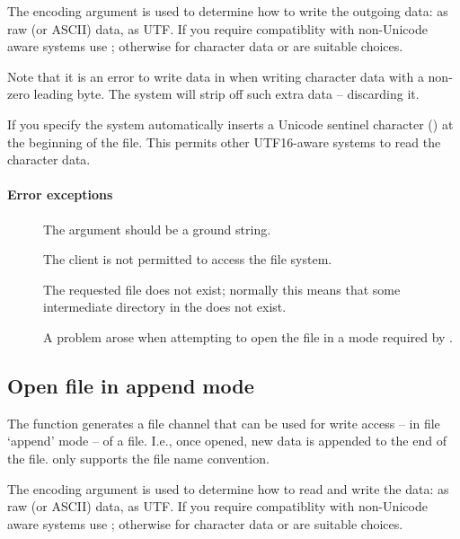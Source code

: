 The encoding argument is used to determine how to write the outgoing data: as raw (or ASCII) data, as UTF. If you require compatiblity with non-Unicode aware systems use ; otherwise for character data  or  are suitable choices.

Note that it is an error to write data in  when writing character data with a non-zero leading byte. The \go system will strip off such extra data -- discarding it.

If you specify  the \go system automatically inserts a Unicode sentinel character () at the beginning of the file. This permits other UTF16-aware systems to read the character data.

\paragraph{Error exceptions}
\begin{description}
\item[]
The  argument should be a ground string.
\item[]
The client is not permitted to access the file system.
\item[]
The requested file does not exist; normally this means that some intermediate directory in the  does not exist.
\item[]
A problem arose when attempting to open the file in a mode required by \go.
\end{description}

\subsection{Open file in append mode}
\label{io:openappend}
The  function generates a file channel that can be used for write access -- in file `append' mode -- of a file. I.e., once opened, new data is appended to the end of the file.  only supports the  file name convention.

The encoding argument is used to determine how to read and write the data: as raw (or ASCII) data, as UTF. If you require compatiblity with non-Unicode aware systems use ; otherwise for character data  or  are suitable choices.

